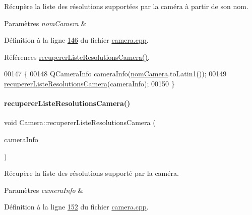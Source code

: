 Récupère la liste des résolutions supportées par la caméra à partir de son nom. 


\begin{DoxyParams}{Paramètres}
{\em nom\+Camera} & \\
\hline
\end{DoxyParams}


Définition à la ligne \hyperlink{camera_8cpp_source_l00146}{146} du fichier \hyperlink{camera_8cpp_source}{camera.\+cpp}.



Références \hyperlink{camera_8cpp_source_l00133}{recuperer\+Liste\+Resolutions\+Camera()}.


\begin{DoxyCode}
00147 \{
00148     QCameraInfo cameraInfo(\hyperlink{class_camera_ac1cdaf82921d2a2f3f941d867718eba2}{nomCamera}.toLatin1());
00149     \hyperlink{class_camera_a97267488c5756b4217d4e1fbc68008fd}{recupererListeResolutionsCamera}(cameraInfo);
00150 \}
\end{DoxyCode}
\mbox{\label{class_camera_a4a9f1bcfa19bbd5add6c758c8ad85b5c}} 
\paragraph{\texorpdfstring{recuperer\+Liste\+Resolutions\+Camera()}{recupererListeResolutionsCamera()}\hspace{0.1cm}{\footnotesize\ttfamily [4/4]}}
{\footnotesize\ttfamily void Camera\+::recuperer\+Liste\+Resolutions\+Camera (\begin{DoxyParamCaption}\item[{Q\+Camera\+Info \&}]{camera\+Info }\end{DoxyParamCaption})}



Récupère la liste des résolutions supporté par la caméra. 


\begin{DoxyParams}{Paramètres}
{\em camera\+Info} & \\
\hline
\end{DoxyParams}


Définition à la ligne \hyperlink{camera_8cpp_source_l00152}{152} du fichier \hyperlink{camera_8cpp_source}{camera.\+cpp}.



